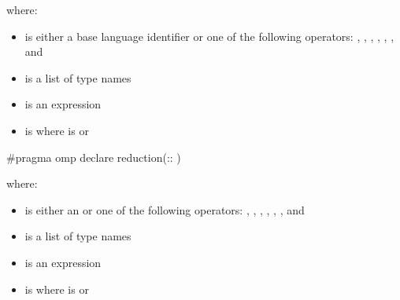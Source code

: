 {{{{where:

\begin{itemize}

\item {} is either a base language identifier or one of the following 
operators: 
\code{+}, 
\code{-}, 
\code{*}, 
\code{\&}, 
\code{|}, 
\code{\^}, 
\code{\&\&} and 
\code{||} 

\item {} is a list of type names 

\item {} is an expression 

\item {} is \code{)}
where  is\linebreak
{} or \code{(}\code{)} 
\end{itemize}
\cspecificend


\cppspecificstart
\begin{boxedcode}
\#pragma omp declare reduction(:: 
)
\end{boxedcode}

where:

\begin{itemize}
\item {} is either an  or one of the following 
operators: 
\code{+}, 
\code{-}, 
\code{*}, 
\code{\&}, 
\code{|}, 
\code{\^}, 
\code{\&\&} and 
\code{||} 

\item {} is a list of type names 

\item {} is an expression 

\item {} is \code{)} 
where  is\linebreak
{}  or \code{(}\code{)} 
\end{itemize}
\cppspecificend


}}}}
